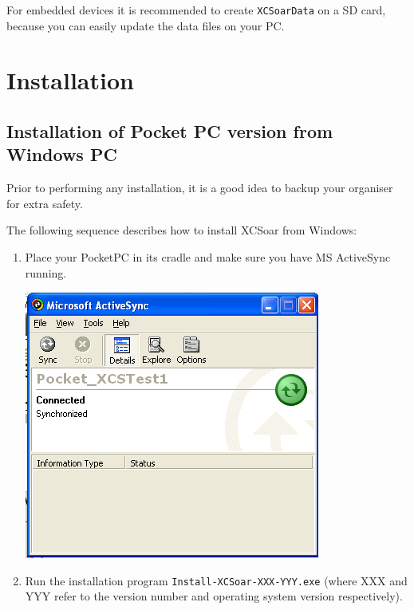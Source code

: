\documentclass[a4paper,12pt]{refrep}
\begin{document}
For embedded devices it is recommended to create \texttt{XCSoarData} on a SD
card, because you can easily update the data files on your PC.

\section{Installation}
\subsection*{Installation of Pocket PC version from Windows PC}

Prior to performing any installation, it is a good idea to backup your
organiser for extra safety.

The following sequence describes how to install XCSoar from Windows:
\begin{enumerate}
\item Place your PocketPC in its cradle and make sure
 you have MS ActiveSync running.
\begin{center}
\includegraphics[angle=0,width=\linewidth,keepaspectratio='true']{figures/XCS_ActiveSync.png}
\end{center}

\item Run the installation program \verb|Install-XCSoar-XXX-YYY.exe| 
  (where XXX and YYY refer to the version number and operating system
  version respectively).


\end{enumerate}
\end{document}
